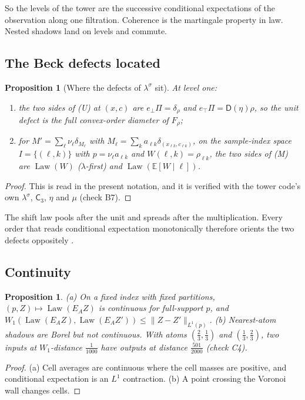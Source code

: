 \documentclass[11pt]{article}
\newtheorem{proposition}[theorem]{Proposition}
\theoremstyle{definition}
\newcommand{\D}{\mathsf D}
\newcommand{\C}{\mathsf C}
\newcommand{\ls}{\lambda^{\sigma}}
\newcommand{\Law}{\operatorname{Law}}
\newcommand{\EE}{\mathbb E}
\newcommand{\ebot}{e_{\perp}}
\newcommand{\etop}{e_{\top}}
\begin{document}
So the levels of the tower are the successive conditional expectations of the observation along one filtration. Coherence is the
martingale property in law. Nested shadows land on levels and commute.

\subsection{The Beck defects located}
\begin{proposition}[Where the defects of $\ls$ sit]\label{prop:beck-located}
At level one:
\begin{enumerate}[label=(\alph*)]
\item the two sides of (U) at $(x,c)$ are $\ebot\Pi=\delta_\rho$ and $\etop\Pi=\D(\eta)\rho$, so the unit defect is the full
  convex-order diameter of $F_\rho$;
\item for $M'=\sum_\ell\nu_\ell\delta_{M_\ell}$ with $M_\ell=\sum_ka_{\ell k}\delta_{(x_{\ell k},c_{\ell k})}$, on the sample-index space
  $I=\{(\ell,k)\}$ with $p=\nu_\ell a_{\ell k}$ and $W(\ell,k)=\rho_{\ell k}$, the two sides of (M) are $\Law(W)$ ($\lambda$-first) and
  $\Law(\EE[W\mid\ell])$.
\end{enumerate}
\end{proposition}
\begin{proof}
This is \cite[Prop.~13.8]{Tower} read in the present notation, and it is verified with the tower code's own $\ls$, $\C_3$, $\eta$ and
$\mu$ (check B7).
\end{proof}

The shift law pools after the unit and spreads after the multiplication. Every order that reads conditional expectation monotonically
therefore orients the two defects oppositely \cite[Prop.~13.9, Thm.~13.15, Prop.~13.17]{Tower}.

\subsection{Continuity}
\begin{proposition}\label{prop:continuity}
(a) On a fixed index with fixed partitions, $(p,Z)\mapsto\Law(E_AZ)$ is continuous for full-support $p$, and
$W_1(\Law(E_AZ),\Law(E_AZ'))\le\lVert Z-Z'\rVert_{L^1(p)}$.
(b) Nearest-atom shadows are Borel but not continuous. With atoms $(\tfrac23,\tfrac13)$ and $(\tfrac13,\tfrac23)$, two inputs at
$W_1$-distance $\tfrac1{1000}$ have outputs at distance $\tfrac{501}{2000}$ (check C4).
\end{proposition}
\begin{proof}
(a) Cell averages are continuous where the cell masses are positive, and conditional expectation is an $L^1$ contraction. (b) A point
crossing the Voronoi wall changes cells.
\end{proof}
\end{document}
